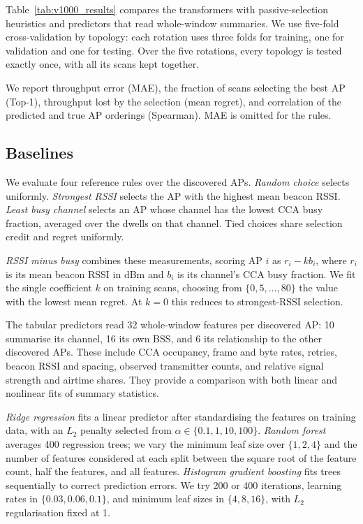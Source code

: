 \documentclass[conference]{IEEEtran}
\begin{document}
Table~\ref{tab:v1000_results} compares the transformers with passive-selection
heuristics and predictors that read whole-window summaries. We use five-fold cross-validation by
topology: each rotation uses three folds for training, one for validation and
one for testing. Over the five rotations, every topology is tested exactly
once, with all its scans kept together.

We report throughput error (MAE), the fraction of
scans selecting the best AP (Top-1), throughput lost by the selection (mean
regret), and correlation of the predicted and true AP orderings (Spearman).
MAE is omitted for the rules.

\subsection{Baselines}

We evaluate four reference rules over the discovered APs. \emph{Random choice}
selects uniformly. \emph{Strongest RSSI} selects the
AP with the highest mean beacon RSSI. \emph{Least busy channel}
selects an AP whose channel has the lowest CCA busy fraction, averaged over
the dwells on that channel. Tied choices share selection credit and regret
uniformly.

\emph{RSSI minus busy} combines these measurements, scoring AP $i$ as
$r_i-kb_i$, where $r_i$ is its mean beacon RSSI in dBm and $b_i$ is its
channel's CCA busy fraction. We fit the single coefficient $k$ on training
scans, choosing from $\{0,5,\ldots,80\}$ the value with the lowest mean regret.
At $k=0$ this reduces to strongest-RSSI selection.

The tabular predictors read 32 whole-window features per discovered AP:
10 summarise its channel, 16 its own BSS, and 6 its relationship to the other
discovered APs. These include CCA occupancy, frame and byte rates, retries,
beacon RSSI and spacing, observed transmitter counts, and relative signal
strength and airtime shares. They provide a comparison with both linear and
nonlinear fits of summary statistics.

\emph{Ridge regression} fits a linear predictor after standardising the
features on training data, with an $L_2$ penalty selected from
$\alpha\in\{0.1,1,10,100\}$. \emph{Random forest} averages 400 regression
trees; we vary the minimum leaf size over $\{1,2,4\}$ and the number of
features considered at each split between the square root of the feature
count, half the features, and all features. \emph{Histogram gradient boosting}
fits trees sequentially to correct prediction errors. We try 200 or 400
iterations, learning rates in $\{0.03,0.06,0.1\}$, and minimum leaf sizes in
$\{4,8,16\}$, with $L_2$ regularisation fixed at 1.
\end{document}
